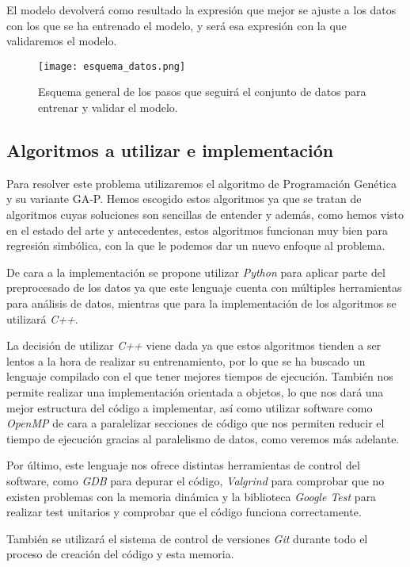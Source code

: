 El modelo devolverá como resultado la expresión que mejor se ajuste a los datos con los que se ha entrenado el modelo, y será esa expresión con la que validaremos el modelo.

\begin{figure}[H]
    \centering
	  \texttt{[image: esquema\_datos.png]}
    \caption{Esquema general de los pasos que seguirá el conjunto de datos para entrenar y validar el modelo.}
	 \label{fig:esquema_datos}
\end{figure}

\newpage

\subsection{Algoritmos a utilizar e implementación}

Para resolver este problema utilizaremos el algoritmo de Programación Genética y su variante GA-P. Hemos escogido estos algoritmos ya que se tratan de algoritmos cuyas soluciones son sencillas de entender y además, como hemos visto en el estado del arte y antecedentes, estos algoritmos funcionan muy bien para regresión simbólica, con la que le podemos dar un nuevo enfoque al problema.

De cara a la implementación se propone utilizar \textit{Python} para aplicar parte del preprocesado de los datos ya que este lenguaje cuenta con múltiples herramientas para análisis de datos, mientras que para la implementación de los algoritmos se utilizará \textit{C++}.

La decisión de utilizar \textit{C++} viene dada ya que estos algoritmos tienden a ser lentos a la hora de realizar su entrenamiento, por lo que se ha buscado un lenguaje compilado con el que tener mejores tiempos de ejecución. También nos permite realizar una implementación orientada a objetos, lo que nos dará una mejor estructura del código a implementar, así como utilizar software como \textit{OpenMP} \cite{OpenMP} de cara a paralelizar secciones de código que nos permiten reducir el tiempo de ejecución gracias al paralelismo de datos, como veremos más adelante.

Por último, este lenguaje nos ofrece distintas herramientas de control del software, como \textit{GDB} \cite{gdb} para depurar el código, \textit{Valgrind} \cite{valgrind} para comprobar que no existen problemas con la memoria dinámica y la biblioteca \textit{Google Test} \cite{gtest} para realizar test unitarios y comprobar que el código funciona correctamente.

También se utilizará el sistema de control de versiones \textit{Git} \cite{git} durante todo el proceso de creación del código y esta memoria.


\newpage
